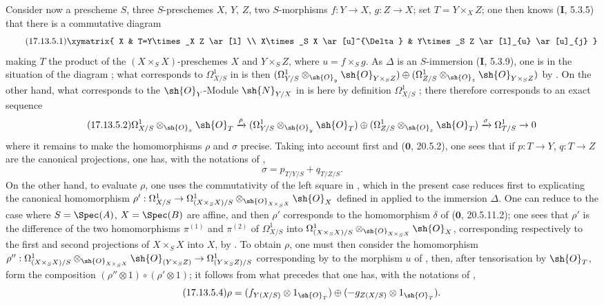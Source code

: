 \begin{env}[17.13.5]
\label{IV.17.13.5}
Consider now a prescheme $S$, three $S$-preschemes $X$, $Y$, $Z$, two $S$-morphisms $f:Y\to X$, $g:Z\to X$; set $T=Y\times_X Z$; one then knows (\textbf{I}, 5.3.5) that there is a commutative diagram
\[
\label{IV.17.13.5.1}
\tag{17.13.5.1}
\xymatrix{
  X & T=Y\times_X Z \ar[l] \\
  X\times_S X \ar[u]^{\Delta} & Y\times_S Z \ar[l]_{u} \ar[u]_{j}
}
\]
making $T$ the product of the $(X\times_S X)$-preschemes $X$ and $Y\times_S Z$, where $u=f\times_S g$.
As $\Delta$ is an $S$-immersion (\textbf{I}, 5.3.9), one is in the situation of the diagram ; what corresponds to $\Omega^1_{X/S}$ in  is then $(\Omega^1_{Y/S}\otimes_{\sh{O}_y}\sh{O}_{Y\times_S Z})\oplus(\Omega^1_{Z/S}\otimes_{\sh{O}_z}\sh{O}_{Y\times_S Z})$ by .
On the other hand, what corresponds to the $\sh{O}_Y$-Module $\sh{N}_{Y/X}$ in  is here by definition $\Omega^1_{X/S}$ ; there therefore corresponds to  an exact sequence
\[
\label{IV.17.13.5.2}
\tag{17.13.5.2}
\Omega^1_{X/S}\otimes_{\sh{O}_x}\sh{O}_T \xrightarrow{\rho} (\Omega^1_{Y/S}\otimes_{\sh{O}_y}\sh{O}_T)\oplus(\Omega^1_{Z/S}\otimes_{\sh{O}_z}\sh{O}_T) \xrightarrow{\sigma} \Omega^1_{T/S} \to 0
\]
where it remains to make the homomorphisms $\rho$ and $\sigma$ precise.
Taking into account first  and ($\mathbf{0}$, 20.5.2), one sees that if $p:T\to Y$, $q:T\to Z$ are the canonical projections, one has, with the notations of ,
\[
\label{IV.17.13.5.3}
\tag{17.13.5.3}
\sigma = p_{T/Y/S} + q_{T/Z/S}.
\]
On the other hand, to evaluate $\rho$, one uses the commutativity of the left square in , which in the present case reduces first to explicating the canonical homomorphism
$\rho': \Omega^1_{X/S} \to \Omega^1_{(X\times_S X)/S}\otimes_{\sh{O}_{X\times_S X}}\sh{O}_X$
defined in  applied to the immersion $\Delta$.
One can reduce to the case where $S=\Spec(A)$, $X=\Spec(B)$ are affine, and then $\rho'$ corresponds to the homomorphism $\delta$ of ($\mathbf{0}$, 20.5.11.2);
one sees that $\rho'$ is the difference of the two homomorphisms $\pi^{(1)}$ and $\pi^{(2)}$ of $\Omega^1_{X/S}$ into $\Omega^1_{(X\times_S X)/S}\otimes_{\sh{O}_{X\times_S X}}\sh{O}_X$, corresponding respectively to the first and second projections of $X\times_S X$ into $X$, by .
To obtain $\rho$, one must then consider the homomorphism $\rho'':\Omega^1_{(X\times_S X)/S}\otimes_{\sh{O}_{X\times_S X}}\sh{O}_{(Y\times_S Z)}\to\Omega^1_{(Y\times_S Z)/S}$ corresponding by  to the morphism $u$ of , then, after tensorisation by $\sh{O}_T$, form the composition $(\rho''\otimes 1)\circ(\rho'\otimes 1)$; it follows from what precedes that one has, with the notations of ,
\[
\label{IV.17.13.5.4}
\tag{17.13.5.4}
\rho = (f_{Y(X/S)}\otimes 1_{\sh{O}_T})\oplus(-g_{Z(X/S)}\otimes 1_{\sh{O}_T}).
\]


\end{env}
